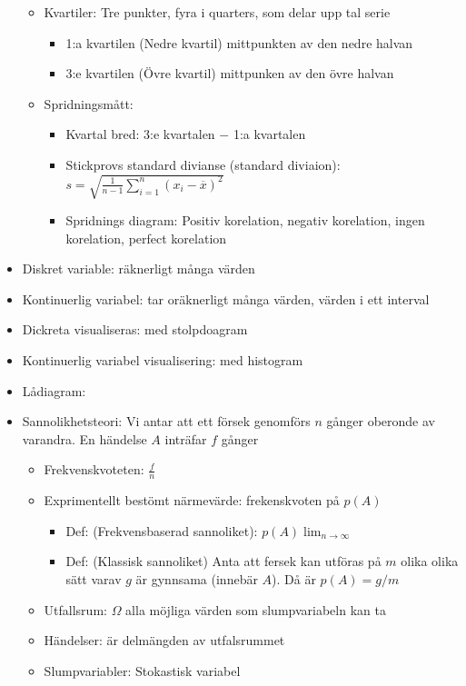 \begin{itemize}
\begin{itemize}
\begin{itemize}
        \end{itemize}
        \item Kvartiler: Tre punkter, fyra i quarters, som delar upp tal serie
        \begin{itemize}
          \item 1:a kvartilen (Nedre kvartil) mittpunkten av den nedre halvan
          \item 3:e kvartilen (Övre kvartil) mittpunken av den övre halvan
        \end{itemize}
        \item Spridningsmått:
        \begin{itemize}
            \item Kvartal bred: 3:e kvartalen $-$ 1:a kvartalen
            \item Stickprovs standard divianse (standard diviaion): $s=\sqrt{\frac{1}{n-1}\sum_{i=1}^{n}(x_i - \overline{x})^2}$
            \item Spridnings diagram: Positiv korelation, negativ korelation, ingen korelation, perfect korelation
        \end{itemize}
    \end{itemize}
    \item Diskret variable: räknerligt många värden
    \item Kontinuerlig variabel: tar oräknerligt många värden, värden i ett interval
    \item Dickreta visualiseras: med stolpdoagram
    \item Kontinuerlig variabel visualisering: med histogram
    \item Lådiagram:
    \item Sannolikhetsteori: Vi antar att ett försek genomförs $n$ gånger oberonde av varandra. En händelse $A$ inträfar $f$ gånger
    \begin{itemize}
      \item Frekvenskvoteten: $\frac{f}{n}$
      \item Exprimentellt bestömt närmevärde: frekenskvoten på $p(A)$
        \begin{itemize}
          \item Def: (Frekvensbaserad sannoliket): $p(A) \lim_{n\to\infty}$
            \item Def: (Klassisk sannoliket) Anta att fersek kan utföras på $m$ olika olika sätt varav $g$ är gynnsama (innebär $A$). Då är $p(A)=g/m$
        \end{itemize}
      \item Utfallsrum: $\Omega$ alla möjliga värden som slumpvariabeln kan ta
      \item Händelser: är delmängden av utfalsrummet
      \item Slumpvariabler: Stokastisk variabel
    \end{itemize}
\end{itemize}

